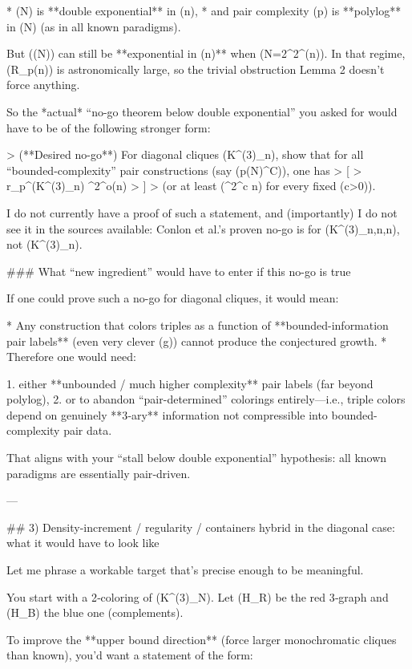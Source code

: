 * (N) is **double exponential** in (n),
* and pair complexity (p) is **polylog** in (N) (as in all known paradigms).

But ((N)) can still be **exponential in (n)** when (N=2^{2^{\Theta(n)}}). In that regime, (R_p(n)) is astronomically large, so the trivial obstruction Lemma 2 doesn’t force anything.

So the *actual* “no-go theorem below double exponential” you asked for would have to be of the following stronger form:

> (**Desired no-go**) For diagonal cliques (K^{(3)}_n), show that for all “bounded-complexity” pair constructions (say (p\le (\log N)^C)), one has
> [
> r_p^{}(K^{(3)}_n) ^{2^{o(n)}}
> ]
> (or at least (^{2^{c n}}) for every fixed (c>0)).

I do not currently have a proof of such a statement, and (importantly) I do not see it in the sources available: Conlon et al.’s proven no-go is for (K^{(3)}_{n,n,n}), not (K^{(3)}_n). 

### What “new ingredient” would have to enter if this no-go is true

If one could prove such a no-go for diagonal cliques, it would mean:

* Any construction that colors triples as a function of **bounded-information pair labels** (even very clever (g)) cannot produce the conjectured growth.
* Therefore one would need:

1. either **unbounded / much higher complexity** pair labels (far beyond polylog),
2. or to abandon “pair-determined” colorings entirely—i.e., triple colors depend on genuinely **3‑ary** information not compressible into bounded-complexity pair data.

That aligns with your “stall below double exponential” hypothesis: all known paradigms are essentially pair‑driven.

---

## 3) Density-increment / regularity / containers hybrid in the diagonal case: what it would have to look like

Let me phrase a workable target that’s precise enough to be meaningful.

You start with a 2‑coloring of (K^{(3)}_N). Let (H_R) be the red 3‑graph and (H_B) the blue one (complements).

To improve the **upper bound direction** (force larger monochromatic cliques than known), you’d want a statement of the form:

